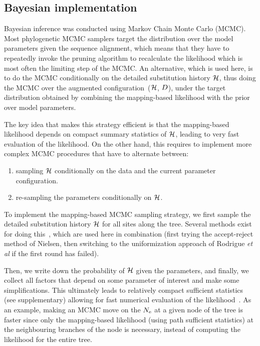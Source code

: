 \documentclass{article}
\begin{document}
\subsection{Bayesian implementation}
\label{sec:Bayesian}
Bayesian inference was conducted using Markov Chain Monte Carlo (MCMC).
Most phylogenetic {MCMC} samplers target the distribution over the model parameters given the sequence alignment, which means that they have to repeatedly invoke the pruning algorithm to recalculate the {likelihood} which is most often the limiting step of the {MCMC}.
An alternative, which is used here, is to do the {MCMC} conditionally on the detailed {substitution} history $\mathcal{H}$, thus doing the {MCMC} over the augmented configuration~($\mathcal{H}$, $D$), under the target distribution obtained by combining the mapping-based {likelihood} with the {prior} over model parameters.

The key idea that makes this strategy efficient is that the mapping-based {likelihood} depends on compact summary statistics of $\mathcal{H}$, leading to very fast evaluation of the {likelihood}.
On the other hand, this requires to implement more complex {MCMC} procedures that have to alternate between:
\begin{enumerate}
    \item sampling $\mathcal{H}$ conditionally on the data and the current parameter configuration.
    \item re-sampling the parameters conditionally on $\mathcal{H}$.
\end{enumerate}

To implement the mapping-based {MCMC} sampling strategy, we first sample the detailed {substitution} history $\mathcal{H}$ for all sites along the tree.
Several methods exist for doing this~\citep{Nielsen2002,Rodrigue2008}, which are used here in combination (first trying the accept-reject method of Nielsen, then switching to the uniformization approach of Rodrigue \textit{et al} if the first round has failed).

Then, we write down the probability of $\mathcal{H}$ given the parameters, and finally, we collect all factors that depend on some parameter of interest and make some simplifications.
This ultimately leads to relatively compact sufficient statistics (see supplementary) allowing for fast numerical evaluation of the likelihood~\citep{Irvahn2014,Davydov2016}.
As an example, making an {MCMC} move on the $N_{\text{e}}$ at a given node of the tree is faster since only the mapping-based {likelihood} (using path sufficient statistics) at the neighbouring branches of the node is necessary, instead of computing the likelihood for the entire tree.
\end{document}
